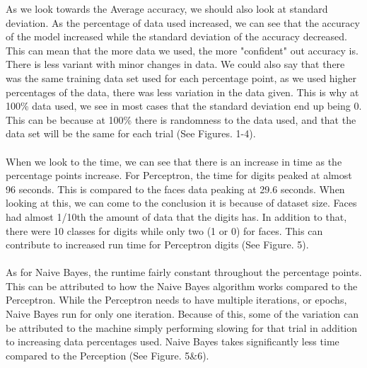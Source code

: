\documentclass[titlepage]{article}
\begin{document}
As we look towards the Average accuracy, we should also look at standard deviation. As the percentage of data used increased, we can see that the accuracy of the model increased while the standard deviation of the accuracy decreased. This can mean that the more data we used, the more "confident" out accuracy is. There is less variant with minor changes in data. We could also say that there was the same training data set used for each percentage point, as we used higher percentages of the data, there was less variation in the data given. This is why at 100\% data used, we see in most cases that the standard deviation end up being 0. This can be because at 100\% there is randomness to the data used, and that the data set will be the same for each trial (See Figures. 1-4).\\
\\
When we look to the time, we can see that there is an increase in time as the percentage points increase. For Perceptron, the time for digits peaked at almost 96 seconds. This is compared to the faces data peaking at 29.6 seconds. When looking at this, we can come to the conclusion it is because of dataset size. Faces had almost 1/10th the amount of data that the digits has. In addition to that, there were 10 classes for digits while only two (1 or 0) for faces. This can contribute to increased run time for Perceptron digits (See Figure. 5).\\
\\
As for Naive Bayes, the runtime fairly constant throughout the percentage points. This can be attributed to how the Naive Bayes algorithm works compared to the Perceptron. While the Perceptron needs to have multiple iterations, or epochs, Naive Bayes run for only one iteration. Because of this, some of the variation can be attributed to the machine simply performing slowing for that trial in addition to increasing data percentages used. Naive Bayes takes significantly less time compared to the Perception (See Figure. 5\&6). 
\end{document}

